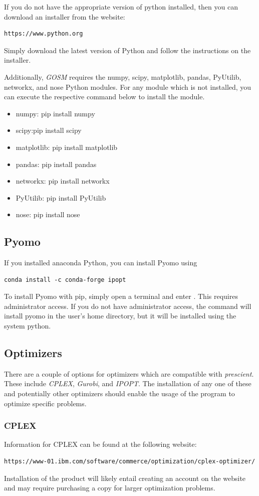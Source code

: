 \documentclass[11pt]{article}
\begin{document}
If you do not have the appropriate version of python installed, then you can download an installer from the website:
\begin{verbatim}
https://www.python.org
\end{verbatim}
Simply download the latest version of Python and follow the instructions on the installer.

Additionally, {\it GOSM} requires the numpy, scipy, matplotlib, pandas, PyUtilib, networkx, and nose Python modules.
For any module which is not installed, you can execute the respective command below to install the module.
\begin{itemize}
\item numpy: pip install numpy
\item scipy:pip install scipy
\item matplotlib: pip install matplotlib
\item pandas: pip install pandas
\item networkx: pip install networkx
\item PyUtilib: pip install PyUtilib
\item nose: pip install nose
\end{itemize}

\subsection{Pyomo}
If you installed anaconda Python, you can install Pyomo using

\begin{verbatim}
conda install -c conda-forge ipopt 
\end{verbatim}

To install Pyomo with pip, simply open a terminal and enter .
This requires administrator access. If you do not have administrator access, 
the command  will install pyomo in the user's 
home directory, but it will be installed using the system python. 

\subsection{Optimizers}
There are a couple of options for optimizers which are compatible with \textit{prescient}. These include \textit{CPLEX}, \textit{Gurobi}, and \textit{IPOPT}.
The installation of any one of these and potentially other optimizers should enable the usage of the program to optimize specific problems.
\subsubsection{CPLEX}
Information for CPLEX can be found at the following website:
\begin{verbatim}
https://www-01.ibm.com/software/commerce/optimization/cplex-optimizer/
\end{verbatim}
Installation of the product will likely entail creating an account on the website and may require purchasing a copy for larger optimization problems.
\end{document}
